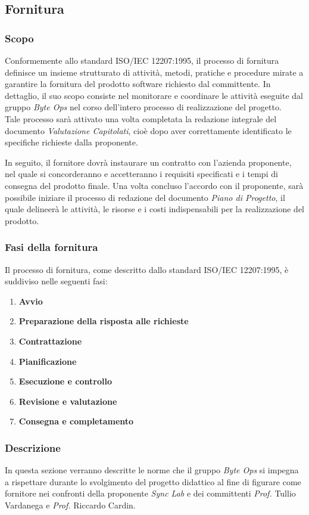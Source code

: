 \subsection{Fornitura}
\subsubsection{Scopo}
Conformemente allo standard ISO/IEC 12207:1995, il processo di fornitura definisce un insieme strutturato di attività, metodi, pratiche e procedure mirate a garantire la fornitura del prodotto software richiesto dal committente. 
In dettaglio, il suo scopo consiste nel monitorare e coordinare le attività eseguite dal gruppo \textit{Byte Ops} nel corso dell'intero processo di realizzazione del progetto.\\
Tale processo sarà attivato una volta completata la redazione integrale del documento \textit{Valutazione Capitolati}, cioè dopo aver correttamente identificato le specifiche richieste dalla proponente.

In seguito, il fornitore dovrà instaurare un contratto con l'azienda proponente, nel quale si concorderanno e accetteranno i requisiti specificati e i tempi di consegna del prodotto finale. Una volta concluso l'accordo con il proponente, sarà possibile iniziare il processo di redazione del documento
\textit{Piano di Progetto}, il quale delineerà le attività, le risorse e i costi indispensabili per la realizzazione del prodotto.

\subsubsection{Fasi della fornitura}
Il processo di fornitura, come descritto dallo standard ISO/IEC 12207:1995, è suddiviso nelle seguenti fasi:
\begin{enumerate}
    \item \textbf{Avvio}
    \item \textbf{Preparazione della risposta alle richieste}
    \item \textbf{Contrattazione}
    \item \textbf{Pianificazione}
    \item \textbf{Esecuzione e controllo}
    \item \textbf{Revisione e valutazione}
    \item \textbf{Consegna e completamento}
\end{enumerate}

\subsubsection{Descrizione}
In questa sezione verranno descritte le norme che il gruppo \textit{Byte Ops} si impegna a rispettare durante lo svolgimento del progetto didattico al fine di figurare come fornitore nei confronti della proponente \textit{Sync Lab} e dei committenti \textit{Prof.} Tullio Vardanega e \textit{Prof.} Riccardo Cardin.

